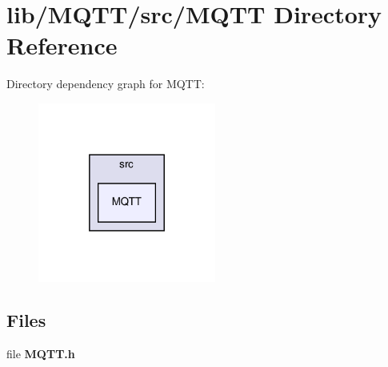 \section{lib/\+M\+Q\+T\+T/src/\+M\+Q\+TT Directory Reference}
\label{dir_e4828b6ae6bed0dcb1bb3a2d3293b57d}
Directory dependency graph for M\+Q\+TT\+:\nopagebreak
\begin{figure}[H]
\begin{center}
\leavevmode
\includegraphics[width=166pt]{dir_e4828b6ae6bed0dcb1bb3a2d3293b57d_dep}
\end{center}
\end{figure}
\subsection*{Files}
\begin{DoxyCompactItemize}
\item 
file \textbf{ M\+Q\+T\+T.\+h}
\end{DoxyCompactItemize}

